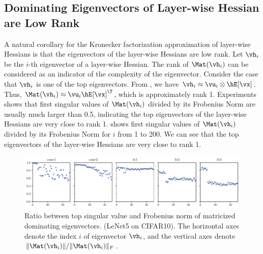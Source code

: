 \subsection{Dominating Eigenvectors of Layer-wise Hessian are Low Rank}
\label{sec:appendix_low_rank_eigenvector}

A natural corollary for the Kronecker factorization approximation of layer-wise Hessians is that the eigenvectors of the layer-wise Hessians are low rank. Let $\vh_i$ be the $i$-th eigenvector of a layer-wise Hessian.
The rank of $\Mat(\vh_i)$ can be considered as an indicator of the complexity of the eigenvector. Consider the case that $\vh_i$ is one of the top eigenvectors. From , we have $\vh_i \approx \vu_i \otimes \hE[\vx]$. %
Thus, $\Mat(\vh_i) \approx \vu_i\hE[\vx]^\T$, which is approximately rank 1. Experiments shows that first singular values of $\Mat(\vh_i)$ divided by its Frobenius Norm are usually much larger than 0.5, indicating the top eigenvectors of the layer-wise Hessians are very close to rank 1.
 shows first singular values of $\Mat(\vh_i)$ divided by its Frobenius Norm for $i$ from 1 to 200. We can see that the top eigenvectors of the layer-wise Hessians are very close to rank 1.
 \begin{figure}[h]
     \includegraphics[width=\columnwidth]{Figures/Eigenvec_Lowrank/NLeNet_base/5x1_Top_Eigenvector_rank_CIFAR10_Exp1_LeNet5_normnew_fixlr0.01R2_E-1_50.pdf}
      \vspace{-0.2in}
     \caption{Ratio between top singular value and Frobenius norm of matricized dominating eigenvectors. (LeNet5 on CIFAR10). The horizontal axes denote the index $i$ of eigenvector $\vh_i$, and the vertical axes denote $\|\Mat(\vh_i)\|/\|\Mat(\vh_i)\|_F$.}
    \label{fig:eigen_lowrank}
     \vspace{-2em}
 \end{figure}
